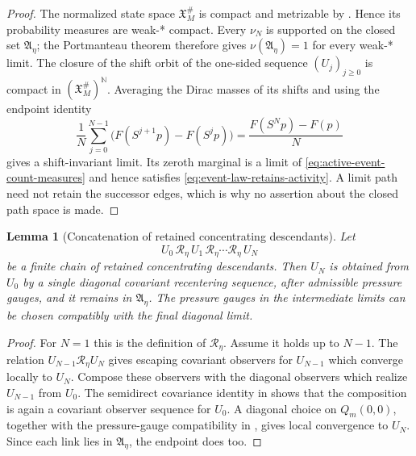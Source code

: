 \documentclass[11pt]{amsart}
\numberwithin{equation}{section}
\theoremstyle{plain}
\newtheorem{lemma}[lemma]{Lemma}
\theoremstyle{definition}
\theoremstyle{remark}
\begin{document}
\begin{proof}
The normalized state space \(\mathfrak X_M^\#\) is compact and metrizable by
.  Hence its probability measures are
weak-* compact.  Every \(\nu_N\) is supported on the closed set
\(\mathfrak A_\eta\); the Portmanteau theorem therefore gives
\(\nu(\mathfrak A_\eta)=1\) for every weak-* limit.  The closure of the shift
orbit of the one-sided sequence \((U_j)_{j\ge0}\) is compact in
\((\mathfrak X_M^\#)^{\mathbb N}\).  Averaging the Dirac masses of its shifts
and using the endpoint identity
\[
 \frac1N\sum_{j=0}^{N-1}\bigl(F(S^{j+1}p)-F(S^jp)\bigr)
 =\frac{F(S^Np)-F(p)}N
\]
gives a shift-invariant limit.  Its zeroth marginal is a limit of
\eqref{eq:active-event-count-measures} and hence satisfies
\eqref{eq:event-law-retains-activity}.  A limit path need not retain the
successor edges, which is why no assertion about the closed path space is
made.
\end{proof}

\begin{lemma}[Concatenation of retained concentrating descendants]
\label{lem:active-descendant-concatenation}
Let
\[
   U_0\,\mathcal R_\eta\,U_1\,\mathcal R_\eta\cdots
   \mathcal R_\eta\,U_N
\]
be a finite chain of retained concentrating descendants.  Then \(U_N\) is obtained from \(U_0\) by a
single diagonal covariant recentering sequence, after admissible pressure
gauges, and it remains in \(\mathfrak A_\eta\).  The pressure gauges in the
intermediate limits can be chosen compatibly with the final diagonal limit.
\end{lemma}

\begin{proof}
For \(N=1\) this is the definition of \(\mathcal R_\eta\).  Assume it holds up
to \(N-1\).  The relation \(U_{N-1}\mathcal R_\eta U_N\) gives escaping
covariant observers for \(U_{N-1}\) which converge locally to \(U_N\).  Compose
these observers with the diagonal observers which realize \(U_{N-1}\) from
\(U_0\).  The semidirect covariance identity in
 shows that the composition is again a
covariant observer sequence for \(U_0\).  A diagonal choice on \(Q_m(0,0)\),
together with the pressure-gauge compatibility in
, gives local convergence to \(U_N\).  Since each
link lies in \(\mathfrak A_\eta\), the endpoint does too.
\end{proof}
\end{document}

